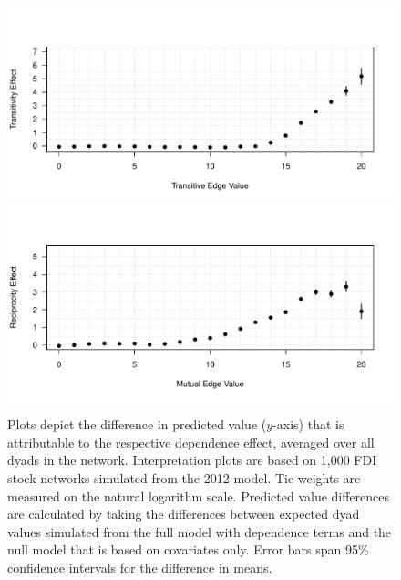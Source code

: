 \documentclass[reqno,onecolumn,letterpaper,12pt]{article}
\begin{document}
\begin{figure}[!h]
\centering
\includegraphics[scale=.75]{draft_figures/transitiveInterpretation.pdf} \vspace{-.5cm}\\
\includegraphics[scale=.75]{draft_figures/mutualInterpretation.pdf} \vspace{-.5cm}
\caption{\label{fig:interpret} Plots depict the difference in predicted value ($y$-axis) that is attributable to the respective dependence effect, averaged over all dyads in the network. Interpretation plots are based on 1,000 FDI stock networks simulated from the 2012 model. Tie weights are measured on the natural logarithm scale. Predicted value differences are calculated by taking the differences between expected dyad values simulated from the full model with dependence terms and the null model that is based on covariates only. Error bars span 95\% confidence intervals for the difference in means. }
\end{figure}
\end{document}
